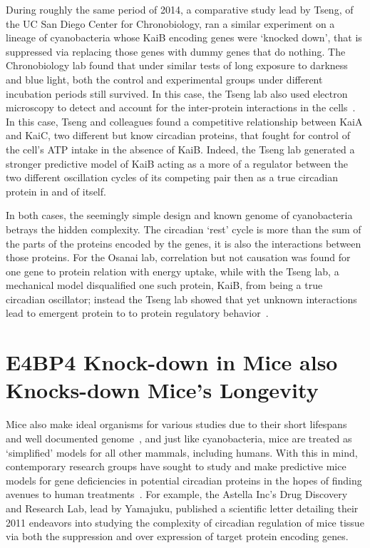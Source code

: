 \documentclass [12pt]{article}
\begin{document}
	\indent During roughly the same period of 2014, a comparative study lead by Tseng, of the UC San Diego Center for Chronobiology, ran a similar experiment on a lineage of cyanobacteria whose KaiB encoding genes were {`}knocked down', that is suppressed via replacing those genes with dummy genes that do nothing. The Chronobiology lab found that under similar tests of long exposure to darkness and blue light, both the control and experimental groups under different incubation periods still survived. In this case, the Tseng lab also used electron microscopy to detect and account for the inter-protein interactions in the cells~\autocite{Tseng2014}. In this case, Tseng and colleagues found a competitive relationship between KaiA and KaiC, two different but know circadian proteins, that fought for control of the cell's ATP intake in the absence of KaiB.  Indeed, the Tseng lab generated a stronger predictive model of KaiB acting as a more of a regulator between the two different oscillation cycles of its competing pair then as a true circadian protein in and of itself. \par
	\indent In both cases, the seemingly simple design and known genome of cyanobacteria betrays the hidden complexity. The circadian {`}rest' cycle is more than the sum of the parts of the proteins encoded by the genes, it is also the interactions between those proteins. For the Osanai lab, correlation but not causation was found for one gene to protein relation with energy uptake, while with the Tseng lab, a mechanical model disqualified one such protein, KaiB, from being a true circadian oscillator; instead the Tseng lab showed that yet unknown interactions lead to emergent protein to to protein regulatory behavior~\autocite{Tseng2014}.
\newpage
\section{E4BP4 Knock-down in Mice also Knocks-down Mice’s Longevity}
	\indent Mice also make ideal organisms for various studies due to their short lifespans and well documented genome~\autocite{Shifman2006}, and just like cyanobacteria, mice are treated as {`}simplified'  models for all other mammals, including humans. With this in mind, contemporary research groups have sought to study and make predictive mice models for gene deficiencies in potential circadian proteins in the hopes of finding avenues to human treatments~\autocite{Cohen2015}. For example, the Astella Inc's Drug Discovery and Research Lab, lead by Yamajuku, published a scientific letter detailing their 2011 endeavors into studying the complexity of circadian regulation of mice tissue via both the suppression and over expression of target protein encoding genes. \par
\end{document}
